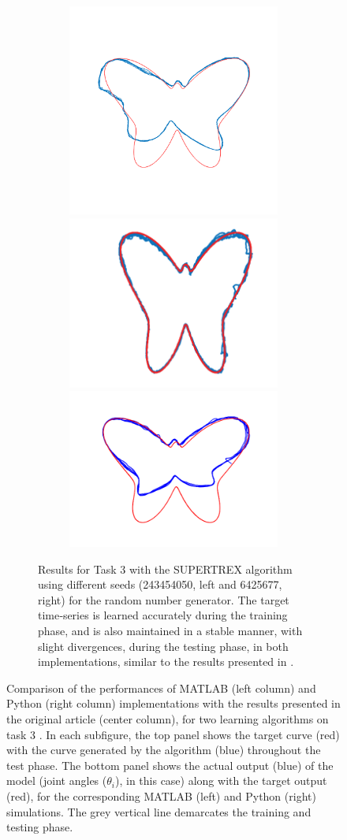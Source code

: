\begin{figure}
\begin{subfigure}{\textwidth}
        \textbf{}\begin{subfigure}{\textwidth}
        \centering
        
        \includegraphics[trim=1.5cm 1cm 1.5cm 0cm, clip=true, height=.26\linewidth]{Figures/MATLAB/ST_T3_243454050_TimeSeries.png} 
        \hspace{2em}
        \includegraphics[height=.2\linewidth]{Figures/Orig/ST_T3_TimeSeries.png} 
        \hspace{2em}
        \includegraphics[trim=1.5cm 1.2cm 1.5cm 1.2cm, clip=true,  height=.2\linewidth]{Figures/Python/ST_T3_6425677_TimeSeries.png} 
        
        \end{subfigure}
        

    \caption{Results for Task 3 with the SUPERTREX algorithm using different seeds (243454050, left and 6425677, right) for the random number generator. The target time‐series is learned accurately during the training phase, and is also maintained in a stable manner, with slight divergences, during the testing phase, in both implementations, similar to the results presented in \cite{pyle2019}.}
    \label{Fig:compTask3STrseeed2}
    
    \end{subfigure}


\caption{Comparison of the performances of MATLAB (left column) and Python (right column) implementations with the results presented in the original article (center column), for two learning algorithms on task 3 \cite{pyle2019}. In each subfigure, the top panel shows the target curve (red) with the curve generated by the algorithm (blue) throughout the test phase. The bottom panel shows the actual output (blue) of the model (joint angles  ($\theta_i$), in this case) along with the target output (red), for the corresponding MATLAB (left) and Python (right) simulations. The grey vertical line demarcates the training and testing phase.}
\label{Fig:Comparison_Task3}

\end{figure}



